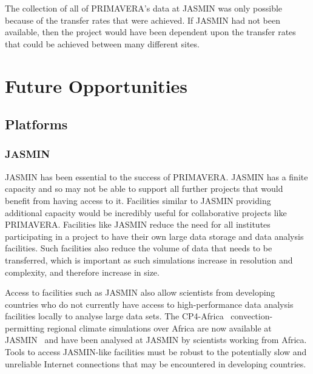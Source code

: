\documentclass[gmd, manuscript]{copernicus}
\begin{document}
The collection of all of PRIMAVERA's data at JASMIN was only possible because of the transfer rates that were achieved. If JASMIN had not been available, then the project would have been dependent upon the transfer rates that could be achieved between many different sites.


\section{Future Opportunities}

\subsection{Platforms}

\subsubsection{JASMIN}
JASMIN has been essential to the success of PRIMAVERA. JASMIN has a finite capacity and so may not be able to support all further projects that would benefit from having access to it. Facilities similar to JASMIN providing additional capacity would be incredibly useful for collaborative projects like PRIMAVERA. Facilities like JASMIN reduce the need for all institutes participating in a project to have their own large data storage and data analysis facilities. Such facilities also reduce the volume of data that needs to be transferred, which is important as such simulations increase in resolution and complexity, and therefore increase in size.

Access to facilities such as JASMIN also allow scientists from developing countries who do not currently have access to high-performance data analysis facilities locally to analyse large data sets. The CP4-Africa~\citep{Stratton2018} convection-permitting regional climate simulations over Africa are now available at JASMIN~\citep{Senior2019} and have been analysed at JASMIN by scientists working from Africa. Tools to access JASMIN-like facilities must be robust to the potentially slow and unreliable Internet connections that may be encountered in developing countries.
\end{document}
